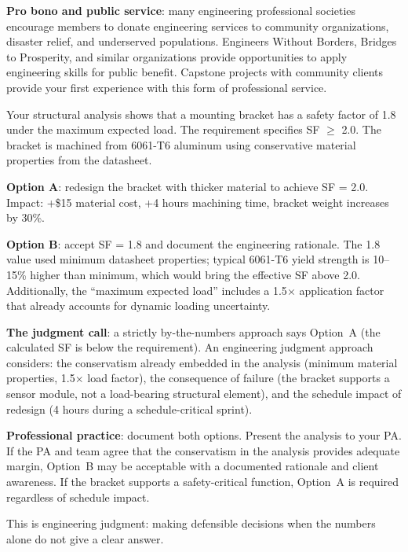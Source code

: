 \textbf{Pro bono and public service}: many engineering professional societies encourage members to donate engineering services to community organizations, disaster relief, and underserved populations. Engineers Without Borders, Bridges to Prosperity, and similar organizations provide opportunities to apply engineering skills for public benefit. Capstone projects with community clients provide your first experience with this form of professional service.



\begin{examplebox}
Your structural analysis shows that a mounting bracket has a safety factor of 1.8 under the maximum expected load. The requirement specifies SF $\geq$ 2.0. The bracket is machined from 6061-T6 aluminum using conservative material properties from the datasheet.

\textbf{Option A}: redesign the bracket with thicker material to achieve SF = 2.0. Impact: +\$15 material cost, +4 hours machining time, bracket weight increases by 30\%.

\textbf{Option B}: accept SF = 1.8 and document the engineering rationale. The 1.8 value used minimum datasheet properties; typical 6061-T6 yield strength is 10--15\% higher than minimum, which would bring the effective SF above 2.0. Additionally, the ``maximum expected load'' includes a 1.5$\times$ application factor that already accounts for dynamic loading uncertainty.

\textbf{The judgment call}: a strictly by-the-numbers approach says Option~A (the calculated SF is below the requirement). An engineering judgment approach considers: the conservatism already embedded in the analysis (minimum material properties, 1.5$\times$ load factor), the consequence of failure (the bracket supports a sensor module, not a load-bearing structural element), and the schedule impact of redesign (4 hours during a schedule-critical sprint).

\textbf{Professional practice}: document both options. Present the analysis to your PA. If the PA and team agree that the conservatism in the analysis provides adequate margin, Option~B may be acceptable with a documented rationale and client awareness. If the bracket supports a safety-critical function, Option~A is required regardless of schedule impact.

This is engineering judgment: making defensible decisions when the numbers alone do not give a clear answer.
\end{examplebox}


